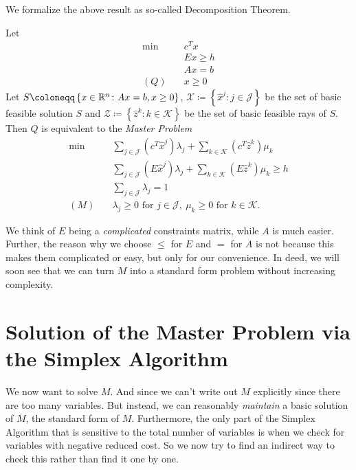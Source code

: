We formalize the above result as so-called Decomposition Theorem.
\begin{theorem}
	\label{Decomposition Theorem}
	Let
	\begin{align*}
		\min~    & c^Tx      \\
		         & Ex \geq h \\
		         & Ax = b    \\
		(Q)\quad & x\geq 0
	\end{align*}
	Let \(S\coloneqq \left\{ x\in\mathbb{\MakeUppercase{R}}^n\colon Ax = b, x\geq 0 \right\}\), \(\mathcal{X} \coloneqq \left\{\hat{x}^j\colon j\in\mathcal{J} \right\}\) be
	the set of basic feasible solution \(S\) and \(\mathcal{Z} \coloneqq \left\{\hat{z}^k\colon k\in\mathcal{K} \right\}\) be the set of basic feasible
	rays of \(S\). Then \(Q\) is equivalent to the \emph{Master Problem }
	\begin{align*}
		\min~    & \sum\limits_{j\in\mathcal{J}}\left(c^T\hat{x}^j\right)\lambda_{j} + \sum\limits_{k\in\mathcal{K}}\left(c^{T} \hat{z}^k  \right)\mu_k \\
		         & \sum\limits_{j\in\mathcal{J}}\left(E\hat{x}^j\right)\lambda_{j} + \sum\limits_{k\in\mathcal{K}}\left(E \hat{z}^k \right)\mu_k \geq h \\
		         & \sum\limits_{j\in\mathcal{J}}\lambda_{j} = 1                                                                                         \\
		(M)\quad & \lambda_{j}\geq 0 \text{ for }j\in\mathcal{J},\ \mu_k\geq 0 \text{ for }k\in\mathcal{K}.
	\end{align*}
\end{theorem}

\begin{remark}
	We think of \(E\) being a \emph{complicated} constraints matrix, while \(A\) is much easier. Further, the reason why we choose \(\leq \) for \(E\) and \(=\) for \(A\) is not because
	this makes them complicated or easy, but only for our convenience. In deed, we will soon see that we can turn \(M\) into a standard form problem without increasing complexity.
\end{remark}

\section{Solution of the Master Problem via the Simplex Algorithm}
We now want to solve \(M\). And since we can't write out \(M\) explicitly since there are too many variables. But instead, we can reasonably
\emph{maintain} a basic solution of \(\overline{M}\), the standard form of \(M\). Furthermore, the only part of the Simplex Algorithm that is
sensitive to the total number of variables is when we check for variables with negative reduced cost. So we now try to find an indirect way to
check this rather than find it one by one.

